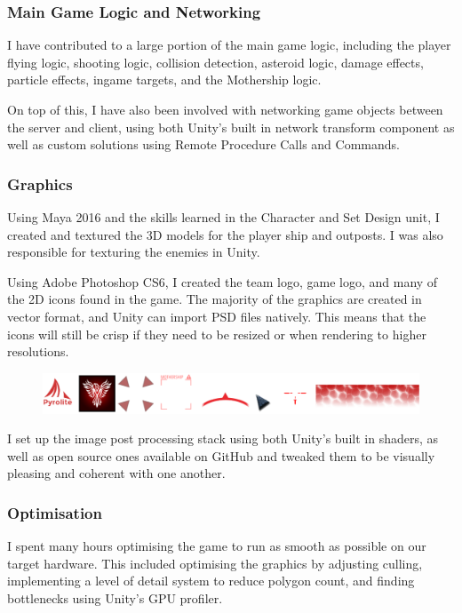 \documentclass[a4paper,11pt]{article}
\begin{document}
\subsubsection{Main Game Logic and Networking}
I have contributed to a large portion of the main game logic, including the player flying logic, shooting logic, collision detection, asteroid logic, damage effects, particle effects, ingame targets, and the Mothership logic.

On top of this, I have also been involved with networking game objects between the server and client, using both Unity’s built in network transform component as well as custom solutions using Remote Procedure Calls and Commands.

\subsubsection{Graphics}
Using Maya 2016 and the skills learned in the Character and Set Design unit, I created and textured the 3D models for the player ship and outposts. I was also responsible for texturing the enemies in Unity. 

Using Adobe Photoshop CS6, I created the team logo, game logo, and many of the 2D icons found in the game. The majority of the graphics are created in vector format, and Unity can import PSD files natively. This means that the icons will still be crisp if they need to be resized or when rendering to higher resolutions.

\begin{figure}[ht]
	\centering
	\includegraphics[width=\textwidth]{images/2dArt}
\end{figure}

I set up the image post processing stack using both Unity’s built in shaders, as well as open source ones available on GitHub and tweaked them to be visually pleasing and coherent with one another.

\subsubsection{Optimisation}
I spent many hours optimising the game to run as smooth as possible on our target hardware. This included optimising the graphics by adjusting culling, implementing a level of detail system to reduce polygon count, and finding bottlenecks using Unity’s GPU profiler.
\end{document}
